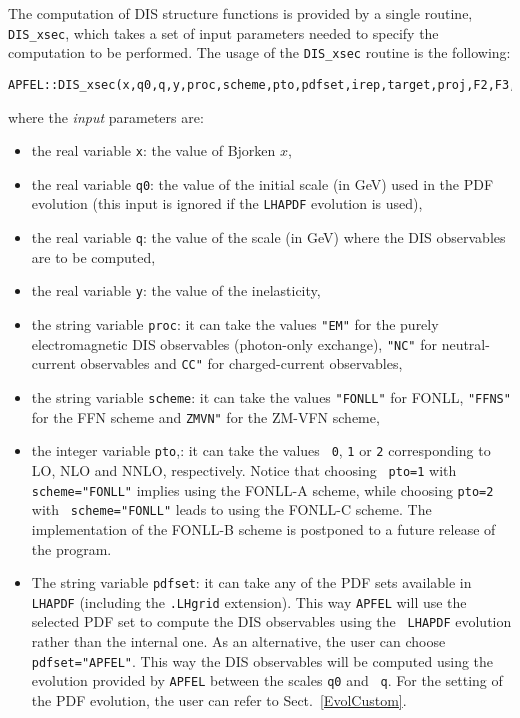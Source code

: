 \documentclass[11pt,a4paper]{article}
\begin{document}
The computation of  DIS  structure functions
is provided by a single routine,
 {\tt DIS\_xsec}, which takes a set of input parameters needed to
 specify the computation to be performed.
The usage of the {\tt DIS\_xsec} routine is the following:
\begin{lstlisting}
APFEL::DIS_xsec(x,q0,q,y,proc,scheme,pto,pdfset,irep,target,proj,F2,F3,FL,sigma);
\end{lstlisting}
where the \textit{input} parameters are:
\begin{itemize}

\item the real variable {\tt x}: the value of Bjorken $x$,

\item the real variable {\tt q0}: the value of the initial scale (in
  GeV) used in the PDF evolution (this input is ignored if the {\tt LHAPDF} evolution
is used),

\item the real variable {\tt q}: the value of the scale (in GeV) where the DIS
 observables are to be computed,

\item the real variable {\tt y}: the value of the inelasticity,

\item the string variable {\tt proc}: it can take the values {\tt "EM"} for the
  purely electromagnetic DIS observables (photon-only exchange), {\tt "NC"}
  for neutral-current observables and {\tt CC"} for charged-current
  observables,

\item the string variable {\tt scheme}: it can take the values {\tt "FONLL"} for FONLL, {\tt "FFNS"}
  for the FFN scheme and {\tt ZMVN"} for the ZM-VFN scheme,

\item the integer variable {\tt pto},: it can take the values {\tt
    0}, {\tt 1} or {\tt 2} corresponding to LO, NLO and NNLO,
  respectively. Notice that choosing {\tt
    pto=1} with {\tt scheme="FONLL"} implies using the
  FONLL-A scheme, while choosing {\tt pto=2} with {\tt
    scheme="FONLL"} leads to using the
  FONLL-C scheme. The implementation of
 the FONLL-B scheme is postponed to a future release of the program.

\item The string variable {\tt pdfset}: it can take any of the PDF sets
  available in {\tt LHAPDF} (including the {\tt .LHgrid} extension). This way {\tt APFEL} will use
  the selected PDF set to compute the DIS observables using the {\tt
    LHAPDF} evolution rather than the internal one. As an alternative, the user can choose {\tt
    pdfset="APFEL"}. This way the DIS observables will be computed
  using the evolution provided by {\tt APFEL} between the scales {\tt q0} and {\tt
    q}. For the setting of the PDF evolution, the user can refer to
  Sect.~\ref{EvolCustom}.


\end{itemize}
\end{document}
